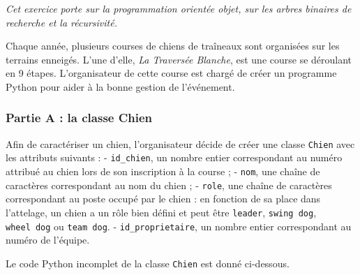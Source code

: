 

\emph{Cet exercice porte sur la programmation orientée objet, sur les
arbres binaires de recherche et la récursivité.}

Chaque année, plusieurs courses de chiens de traîneaux sont organisées
sur les terrains enneigés. L'une d'elle, \emph{La Traversée Blanche},
est une course se déroulant en 9 étapes. L'organisateur de cette course
est chargé de créer un programme Python pour aider à la bonne gestion de
l'événement.

\subsubsection{Partie A : la classe
Chien}\label{partie-a-la-classe-chien}

Afin de caractériser un chien, l'organisateur décide de créer une classe
\texttt{Chien} avec les attributs suivants : - \texttt{id\_chien}, un
nombre entier correspondant au numéro attribué au chien lors de son
inscription à la course ; - \texttt{nom}, une chaîne de caractères
correspondant au nom du chien ; - \texttt{role}, une chaîne de
caractères correspondant au poste occupé par le chien : en fonction de
sa place dans l'attelage, un chien a un rôle bien défini et peut être
\texttt{\textquotesingle{}leader\textquotesingle{}},
\texttt{\textquotesingle{}swing\ dog\textquotesingle{}},
\texttt{\textquotesingle{}wheel\ dog\textquotesingle{}} ou
\texttt{\textquotesingle{}team\ dog\textquotesingle{}}. -
\texttt{id\_proprietaire}, un nombre entier correspondant au numéro de
l'équipe.

Le code Python incomplet de la classe \texttt{Chien} est donné
ci-dessous.

\begin{Shaded}
\begin{Highlighting}[]
 
    \NormalTok{(}
       \OperatorTok{=}
       \OperatorTok{=}
       \OperatorTok{=}
       \OperatorTok{=}
   
       
\end{Highlighting}
\end{Shaded}

